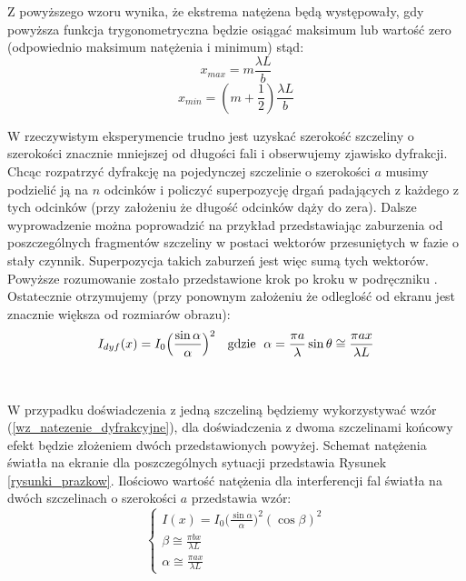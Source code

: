 \documentclass{article}
\begin{document}
Z powyższego wzoru wynika, że ekstrema natężena będą występowały, gdy powyższa funkcja trygonometryczna będzie osiągać maksimum lub wartość zero (odpowiednio maksimum natężenia i minimum) stąd:\\
\begin{equation}
	\label{pozycja_maks_jedna_szczelina_max}
	x_{max} = m\frac{\lambda L}{b}
\end{equation}
\begin{equation}
	\label{pozycja_maks_jedna_szczelina_min}
	x_{min} = (m+\frac{1}{2})\frac{\lambda L}{b}
\end{equation}


W rzeczywistym eksperymencie trudno jest uzyskać szerokość szczeliny o szerokości znacznie mniejszej od długości fali i obserwujemy zjawisko dyfrakcji. Chcąc rozpatrzyć dyfrakcję na pojedynczej szczelinie o szerokości $a$ musimy podzielić ją na $n$ odcinków i policzyć superpozycję drgań padających z każdego z tych odcinków (przy założeniu że długość odcinków dąży do zera). Dalsze wyprowadzenie można poprowadzić na przykład przedstawiając zaburzenia od poszczególnych fragmentów szczeliny w postaci wektorów przesuniętych w fazie o stały czynnik. Superpozycja takich zaburzeń jest więc sumą tych wektorów. Powyższe rozumowanie zostało przedstawione krok po kroku w podręczniku \cite{5}. Ostatecznie otrzymujemy (przy ponownym założeniu że odleglość od ekranu jest znacznie większa od rozmiarów obrazu)\cite{1}:
\begin{equation}
I_{dyf}(x) = I_0\Big(\frac{\sin \alpha}{\alpha}\Big)^2\text{  \hspace{0.1cm}  gdzie   \hspace{0.1cm}} \alpha=\frac{\pi a}{\lambda}\sin\theta \cong \frac{\pi a x}{\lambda L}
\label{wz_natezenie_dyfrakcyjne}
\end{equation}\\\\

W przypadku doświadczenia z jedną szczeliną będziemy wykorzystywać wzór (\ref{wz_natezenie_dyfrakcyjne}), dla doświadczenia z dwoma szczelinami końcowy efekt będzie złożeniem dwóch przedstawionych powyżej. Schemat natężenia światła na ekranie dla poszczególnych sytuacji przedstawia Rysunek \ref{rysunki_prazkow}. Ilościowo wartość natężenia dla interferencji fal światła na dwóch szczelinach o szerokości $a$ przedstawia wzór:
\begin{equation}
\begin{cases}
I(x) = I_0\Big(\frac{\sin \alpha}{\alpha}\Big)^2(\cos \beta)^2   \\
\beta \cong \frac{\pi b x}{\lambda L}\\
\alpha \cong \frac{\pi a x}{\lambda L}
\end{cases}
\end{equation}
\end{document}
